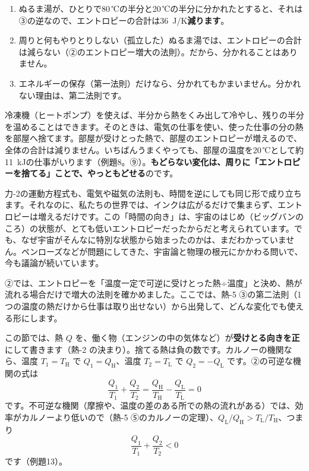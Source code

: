 \begin{enumerate}[label={\bkcircled{\arabic*}}, leftmargin=2.4\zw, itemsep=1pt, topsep=2pt]
\item ぬるま湯が、ひとりで80\,℃の半分と20\,℃の半分に分かれたとすると、それは③の逆なので、エントロピーの合計は\qty{36}{J/K}\textbf{減ります}。
\item 周りと何もやりとりしない（孤立した）ぬるま湯では、エントロピーの合計は減らない（②のエントロピー増大の法則）。だから、分かれることはありません。
\item エネルギーの保存（第一法則）だけなら、分かれてもかまいません。分かれない理由は、第二法則です。
\end{enumerate}

冷凍機（ヒートポンプ）を使えば、半分から熱をくみ出して冷やし、残りの半分を温めることはできます。そのときは、電気の仕事を使い、使った仕事の分の熱を部屋へ捨てます。部屋が受けとった熱で、部屋のエントロピーが増えるので、全体の合計は減りません。いちばんうまくやっても、部屋の温度を20\,℃として約\qty{11}{kJ}の仕事がいります（例題8。⑨）。\textbf{もどらない変化は、周りに「エントロピーを捨てる」ことで、やっともどせる}のです。

\begin{phmada}
力-2の運動方程式も、電気や磁気の法則も、時間を逆にしても同じ形で成り立ちます。それなのに、私たちの世界では、インクは広がるだけで集まらず、エントロピーは増えるだけです。この「時間の向き」は、宇宙のはじめ（ビッグバンのころ）の状態が、とても低いエントロピーだったからだと考えられています。でも、なぜ宇宙がそんなに特別な状態から始まったのかは、まだわかっていません。ペンローズなどが問題にしてきた、宇宙論と物理の根元にかかわる問いで、今も議論が続いています。
\end{phmada}

\phkokomade


\label{ph:熱-6:sec6}
②では、エントロピーを「温度一定で可逆に受けとった熱÷温度」と決め、熱が流れる場合だけで増大の法則を確かめました。ここでは、熱-5 ③の第二法則（1つの温度の熱だけから仕事は取り出せない）から出発して、どんな変化でも使える形にします。

この節では、熱 $Q$ を、働く物（エンジンの中の気体など）が\textbf{受けとる向きを正}にして書きます（熱-2 の決まり）。捨てる熱は負の数です。カルノーの機関なら、温度 $T_1=T_{\mathrm H}$ で $Q_1=Q_{\mathrm H}$、温度 $T_2=T_{\mathrm L}$ で $Q_2=-Q_{\mathrm L}$ です。②の可逆な機関の式は
\[\frac{Q_1}{T_1}+\frac{Q_2}{T_2}=\frac{Q_{\mathrm H}}{T_{\mathrm H}}-\frac{Q_{\mathrm L}}{T_{\mathrm L}}=0\]
です。不可逆な機関（摩擦や、温度の差のある所での熱の流れがある）では、効率がカルノーより低いので（熱-5 ⑤のカルノーの定理）、$Q_{\mathrm L}/Q_{\mathrm H}>T_{\mathrm L}/T_{\mathrm H}$、つまり
\[\frac{Q_1}{T_1}+\frac{Q_2}{T_2}<0\]
です（例題13）。

